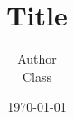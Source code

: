 

\newcommand{\mytitle}{Title}
\newcommand{\myauthor}{Author}
\newcommand{\myclass}{Class}
\newcommand{\mydate}{\today}


\title{\mytitle}
\author{\myauthor \\ \myclass}
\date{\mydate}
\maketitle




